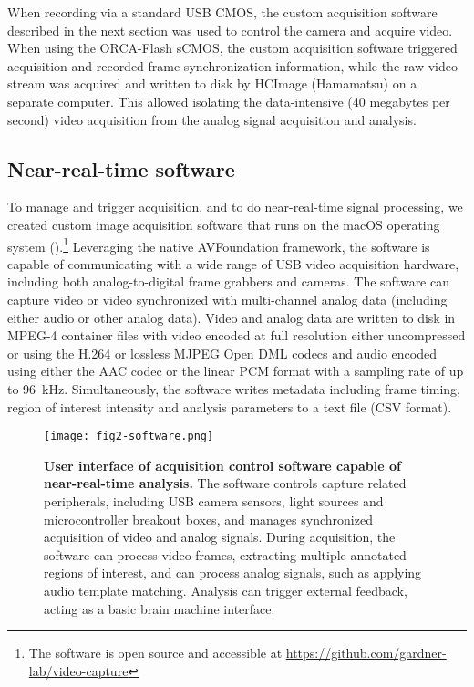 When recording via a standard USB CMOS, the custom 
acquisition software described in the next section 
was used to control the camera and acquire video. 
When using the ORCA-Flash sCMOS, the custom 
acquisition software triggered acquisition and 
recorded frame synchronization information, while 
the raw video stream was acquired and written to 
disk by HCImage (Hamamatsu) on a separate computer. 
This allowed isolating the data-intensive (40 
megabytes per second) video acquisition from the 
analog signal acquisition and analysis.


\subsection{Near-real-time software}

To manage and trigger acquisition, and to do near-real-time signal
processing, we created custom image acquisition software that runs
on the macOS operating system ().\footnote{The 
software is open source and accessible at 
\url{https://github.com/gardner-lab/video-capture}}
Leveraging the native AVFoundation framework, the software is 
capable of communicating with a wide range of USB video 
acquisition hardware, including both analog-to-digital frame 
grabbers and cameras. The software can capture video or video 
synchronized with multi-channel analog data (including 
either audio or other analog data). Video and analog data are 
written to disk in MPEG-4 container files with video encoded at 
full resolution either uncompressed or using the H.264 or lossless 
MJPEG Open DML codecs and audio encoded using either the AAC codec 
or the linear PCM format with a sampling rate of up to 
96~\si{\kilo\hertz}. Simultaneously, the software writes metadata 
including frame timing, region of interest intensity and analysis  
parameters to a text file (CSV format).

\begin{figure}
\texttt{[image: fig2-software.png]}
\caption[Software for capture near-real-time analysis]{\textbf{User interface of acquisition
control software capable of near-real-time analysis.} The software 
controls capture related peripherals, including USB camera sensors,
light sources and microcontroller breakout boxes, and manages 
synchronized acquisition of video and analog signals. During 
acquisition, the software can process video frames, extracting 
multiple annotated regions of interest, and can process analog 
signals, such as applying audio template matching. Analysis 
can trigger external feedback, acting as a basic brain machine 
interface.}
\label{fig:software}
\end{figure}

